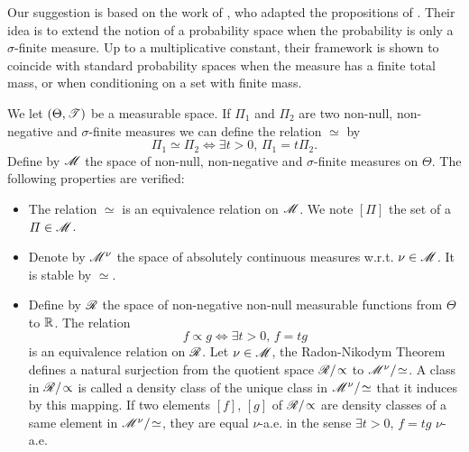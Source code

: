 
Our suggestion is based on the work of \citet{taraldsen_conditional_2016}, who adapted the propositions of \citet{renyi_foundations_1970}. Their idea is to extend the notion of a probability space when the probability is only a $\sigma$-finite measure. Up to a multiplicative constant, their framework is shown to coincide with standard probability spaces when the measure has a finite total mass, or when conditioning on a set with finite mass.


We let $(\Theta,\mathscr{T})$ be a measurable space. If $\varPi_1$ and $\varPi _2$ are two non-null, non-negative and $\sigma$-finite  measures we can define the relation $\simeq$ by
    \begin{equation}
        \varPi_1\simeq\varPi_2\Longleftrightarrow\exists t>0,\,\varPi_1= t\varPi_2.
    \end{equation}
Define by $\mathscr{M}$ the space of non-null, non-negative and $\sigma$-finite measures on $\Theta$. The following properties are verified:
    \begin{itemize}
        \item The relation $\simeq$ is an equivalence relation on $\mathscr{M}$. We note $[\varPi]$ the set of a $\varPi\in\mathscr{M}$.
        \item Denote by $\mathscr{M}^\nu$ the space of absolutely continuous measures w.r.t. $\nu\in\mathscr{M}$. It is stable by $\simeq$.
        \item Define by $\mathscr{R}$ the space of non-negative non-null measurable functions from $\Theta$ to $\mathbb{R}$. The relation%
            \begin{equation}
                f\propto g \Longleftrightarrow\exists t>0,\,f= t g%
            \end{equation}
        is an equivalence relation on $\mathscr{R}$. %
        Let $\nu\in\mathscr{M}$, the Radon-Nikodym Theorem defines a natural surjection from the quotient space $\mathscr{R}/\!\propto$ to $\mathscr{M}^\nu/\!\simeq$. 
        A class in $\mathscr{R}/\!\propto$ is called a density class of the unique class in $\mathscr{M}^\nu/\!\simeq$ that it induces by this mapping. If two elements $[f]$, $[g]$ of $\mathscr{R}/\!\propto$ are density classes of a same element in $\mathscr{M}^\nu/\!\simeq$, they are equal $\nu$-a.e. in the sense $\exists t>0$, $f= t g$ $\nu$-a.e.
    \end{itemize}

